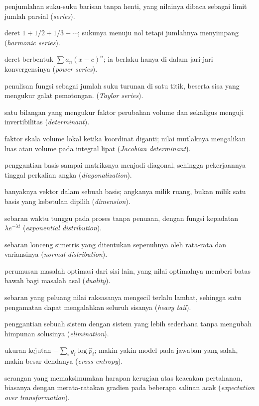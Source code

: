 \begin{description}[style=nextline,itemsep=0.35em]
  \item[Deret] penjumlahan suku-suku barisan tanpa henti, yang nilainya dibaca sebagai limit jumlah parsial (\emph{series}).
  \item[Deret harmonik] deret $1+1/2+1/3+\cdots$; sukunya menuju nol tetapi jumlahnya menyimpang (\emph{harmonic series}).
  \item[Deret pangkat] deret berbentuk $\sum a_n(x-c)^n$; ia berlaku hanya di dalam jari-jari konvergensinya (\emph{power series}).
  \item[Deret Taylor] penulisan fungsi sebagai jumlah suku turunan di satu titik, beserta sisa yang mengukur galat pemotongan. (\emph{Taylor series}).
  \item[Determinan] satu bilangan yang mengukur faktor perubahan volume dan sekaligus menguji invertibilitas (\emph{determinant}).
  \item[Determinan Jacobian] faktor skala volume lokal ketika koordinat diganti; nilai mutlaknya mengalikan luas atau volume pada integral lipat (\emph{Jacobian determinant}).
  \item[Diagonalisasi] penggantian basis sampai matriksnya menjadi diagonal, sehingga pekerjaannya tinggal perkalian angka (\emph{diagonalization}).
  \item[Dimensi] banyaknya vektor dalam sebuah basis; angkanya milik ruang, bukan milik satu basis yang kebetulan dipilih (\emph{dimension}).
  \item[Distribusi eksponensial] sebaran waktu tunggu pada proses tanpa penuaan, dengan fungsi kepadatan $\lambda e^{-\lambda t}$ (\emph{exponential distribution}).
  \item[Distribusi normal] sebaran lonceng simetris yang ditentukan sepenuhnya oleh rata-rata dan variansinya (\emph{normal distribution}).
  \item[Dualitas] perumusan masalah optimasi dari sisi lain, yang nilai optimalnya memberi batas bawah bagi masalah asal (\emph{duality}).
  \item[Ekor berat] sebaran yang peluang nilai raksasanya mengecil terlalu lambat, sehingga satu pengamatan dapat mengalahkan seluruh sisanya (\emph{heavy tail}).
  \item[Eliminasi] penggantian sebuah sistem dengan sistem yang lebih sederhana tanpa mengubah himpunan solusinya (\emph{elimination}).
  \item[Entropi silang] ukuran kejutan $-\sum_i y_i\log \hat{p}_i$; makin yakin model pada jawaban yang salah, makin besar dendanya (\emph{cross-entropy}).
  \item[EOT] serangan yang memaksimumkan harapan kerugian atas keacakan pertahanan, biasanya dengan merata-ratakan gradien pada beberapa salinan acak (\emph{expectation over transformation}).

\end{description}
